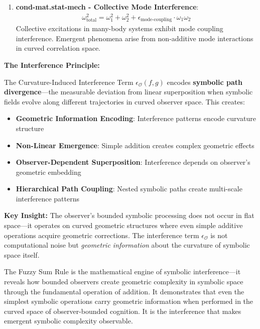 \begin{scholium}
\begin{enumerate}
\item \textbf{cond-mat.stat-mech - Collective Mode Interference}:
   \begin{align}
   \omega_{\text{total}}^2 = \omega_1^2 + \omega_2^2 + \epsilon_{\text{mode-coupling}} \cdot \omega_1 \omega_2
   \end{align}
   Collective excitations in many-body systems exhibit mode coupling interference. Emergent phenomena arise from non-additive mode interactions in curved correlation space.
\end{enumerate}
\end{scholium}

\textbf{The Interference Principle:}

The Curvature-Induced Interference Term $\epsilon_{\mathcal{O}}(f, g)$ encodes \textbf{symbolic path divergence}---the measurable deviation from linear superposition when symbolic fields evolve along different trajectories in curved observer space. This creates:

\begin{itemize}
\item \textbf{Geometric Information Encoding}: Interference patterns encode curvature structure
\item \textbf{Non-Linear Emergence}: Simple addition creates complex geometric effects
\item \textbf{Observer-Dependent Superposition}: Interference depends on observer's geometric embedding
\item \textbf{Hierarchical Path Coupling}: Nested symbolic paths create multi-scale interference patterns
\end{itemize}

\textbf{Key Insight:} The observer's bounded symbolic processing does not occur in flat space---it operates on curved geometric structures where even simple additive operations acquire geometric corrections. The interference term $\epsilon_{\mathcal{O}}$ is not computational noise but \textit{geometric information} about the curvature of symbolic space itself.

The Fuzzy Sum Rule is the mathematical engine of symbolic interference---it reveals how bounded observers create geometric complexity in symbolic space through the fundamental operation of addition. It demonstrates that even the simplest symbolic operations carry geometric information when performed in the curved space of observer-bounded cognition. It is the interference that makes emergent symbolic complexity observable.

